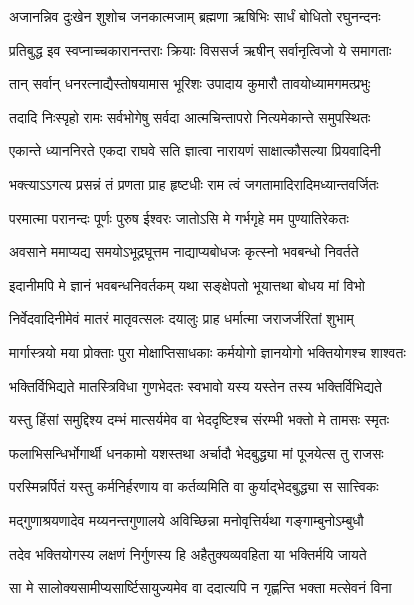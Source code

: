 \twolineshloka
{अजानन्निव दुःखेन शुशोच जनकात्मजाम्}
{ब्रह्मणा ऋषिभिः सार्धं बोधितो रघुनन्दनः} %

\twolineshloka
{प्रतिबुद्ध इव स्वप्नाच्चकारानन्तराः क्रियाः}
{विससर्ज ऋषीन् सर्वानृत्विजो ये समागताः} %

\twolineshloka
{तान् सर्वान् धनरत्नाद्यैस्तोषयामास भूरिशः}
{उपादाय कुमारौ तावयोध्यामगमत्प्रभुः} %

\twolineshloka
{तदादि निःस्पृहो रामः सर्वभोगेषु सर्वदा}
{आत्मचिन्तापरो नित्यमेकान्ते समुपस्थितः} %

\twolineshloka
{एकान्ते ध्याननिरते एकदा राघवे सति}
{ज्ञात्वा नारायणं साक्षात्कौसल्या प्रियवादिनी} %

\twolineshloka
{भक्त्याऽऽगत्य प्रसन्नं तं प्रणता प्राह हृष्टधीः}
{राम त्वं जगतामादिरादिमध्यान्तवर्जितः} %

\twolineshloka
{परमात्मा परानन्दः पूर्णः पुरुष ईश्वरः}
{जातोऽसि मे गर्भगृहे मम पुण्यातिरेकतः} %

\twolineshloka
{अवसाने ममाप्यद्य समयोऽभूद्रघूत्तम}
{नाद्याप्यबोधजः कृत्स्नो भवबन्धो निवर्तते} %

\twolineshloka
{इदानीमपि मे ज्ञानं भवबन्धनिवर्तकम्}
{यथा सङ्क्षेपतो भूयात्तथा बोधय मां विभो} %

\twolineshloka
{निर्वेदवादिनीमेवं मातरं मातृवत्सलः}
{दयालुः प्राह धर्मात्मा जराजर्जरितां शुभाम्} %

\twolineshloka
{मार्गास्त्रयो मया प्रोक्ताः पुरा मोक्षाप्तिसाधकाः}
{कर्मयोगो ज्ञानयोगो भक्तियोगश्च शाश्वतः} %

\twolineshloka
{भक्तिर्विभिद्यते मातस्त्रिविधा गुणभेदतः}
{स्वभावो यस्य यस्तेन तस्य भक्तिर्विभिद्यते} %

\twolineshloka
{यस्तु हिंसां समुद्दिश्य दम्भं मात्सर्यमेव वा}
{भेददृष्टिश्च संरम्भी भक्तो मे तामसः स्मृतः} %

\twolineshloka
{फलाभिसन्धिर्भोगार्थी धनकामो यशस्तथा}
{अर्चादौ भेदबुद्ध्या मां पूजयेत्स तु राजसः} %

\twolineshloka
{परस्मिन्नर्पितं यस्तु कर्मनिर्हरणाय वा}
{कर्तव्यमिति वा कुर्याद्भेदबुद्ध्या स सात्त्विकः} %

\twolineshloka
{मद्गुणाश्रयणादेव मय्यनन्तगुणालये}
{अविच्छिन्ना मनोवृत्तिर्यथा गङ्गाम्बुनोऽम्बुधौ} %

\twolineshloka
{तदेव भक्तियोगस्य लक्षणं निर्गुणस्य हि}
{अहैतुक्यव्यवहिता या भक्तिर्मयि जायते} %

\twolineshloka
{सा मे सालोक्यसामीप्यसार्ष्टिसायुज्यमेव वा}
{ददात्यपि न गृह्णन्ति भक्ता मत्सेवनं विना} %

